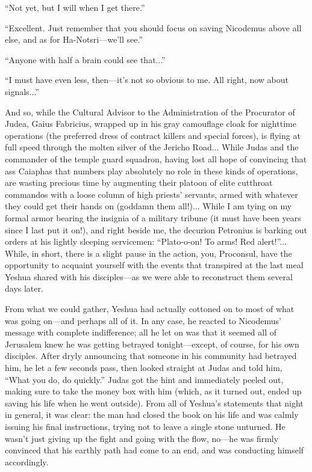 ``Not yet, but I will when I get there.''

``Excellent. Just remember that you should focus on saving Nicodemus above all else, and as for Ha-Notsri---we'll see.''

``Anyone with half a brain could see that...''

``I must have even less, then---it's not so obvious to me. All right, now about signals...''

And so, while the Cultural Advisor to the Administration of the Procurator of Judea, Gaius Fabricius, wrapped up in his gray camouflage cloak for nighttime operations (the preferred dress of contract killers and special forces), is flying at full speed through the molten silver of the Jericho Road... While Judas and the commander of the temple guard squadron, having lost all hope of convincing that ass Caiaphas that numbers play absolutely no role in these kinds of operations, are wasting precious time by augmenting their platoon of elite cutthroat commandos with a loose column of high priests' servants, armed with whatever they could get their hands on (goddamn them all!)... While I am tying on my formal armor bearing the insignia of a military tribune (it must have been years since I last put it on!), and right beside me, the decurion Petronius is barking out orders at his lightly sleeping servicemen: ``Plato-o-on! To arms! Red alert!''... While, in short, there is a slight pause in the action, you, Proconsul, have the opportunity to acquaint yourself with the events that transpired at the last meal Yeshua shared with his disciples---as we were able to reconstruct them several days later.

From what we could gather, Yeshua had actually cottoned on to most of what was going on---and perhaps all of it. In any case, he reacted to Nicodemus' message with complete indifference; all he let on was that it seemed all of Jerusalem knew he was getting betrayed tonight---except, of course, for his own disciples. After dryly announcing that someone in his community had betrayed him, he let a few seconds pass, then looked straight at Judas and told him, ``What you do, do quickly.'' Judas got the hint and immediately peeled out, making sure to take the money box with him (which, as it turned out, ended up saving his life when he went outside). From all of Yeshua's statements that night in general, it was clear: the man had closed the book on his life and was calmly issuing his final instructions, trying not to leave a single stone unturned. He wasn't just giving up the fight and going with the flow, no---he was firmly convinced that his earthly path had come to an end, and was conducting himself accordingly.

